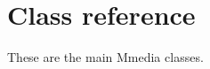 \chapter{Class reference}\label{classref}
%
\setfooter{\thepage}{}{}{}{}{\thepage}

These are the main Mmedia classes.








